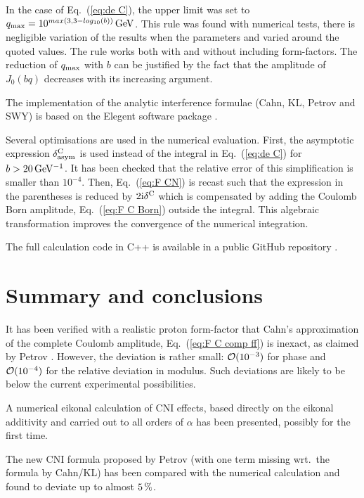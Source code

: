 \documentclass[pdftex,twocolumn,epjc3]{svjour3}
\def\un#1{\,{\rm #1}}
\def\I{{\rm i}}
\begin{document}
In the case of Eq.~(\ref{eq:de C}), the upper limit was set to $q_{\rm max} = 10^{max(3, 3 - log_{10}(b))} \un{GeV}$. This rule was found with numerical tests, there is negligible variation of the results when the parameters and varied around the quoted values. The rule works both with and without including form-factors. The reduction of $q_{\rm max}$ with $b$ can be justified by the fact that the amplitude of $J_0(bq)$ decreases with its increasing argument.

The implementation of the analytic interference formulae (Cahn, KL, Petrov and SWY) is based on the Elegent software package \cite{elegent}.

Several optimisations are used in the numerical evaluation. First, the asymptotic expression $\delta^{\rm C}_{\rm asym}$ is used instead of the integral in Eq.~(\ref{eq:de C}) for $b > 20\un{GeV^{-1}}$. It has been checked that the relative error of this simplification is smaller than $10^{-4}$. Then, Eq.~(\ref{eq:F CN}) is recast such that the expression in the parentheses is reduced by $2\I\delta^{\rm C}$ which is compensated by adding the Coulomb Born amplitude, Eq.~(\ref{eq:F C Born}) outside the integral. This algebraic transformation improves the convergence of the numerical integration.

The full calculation code in C++ is available in a public GitHub repository \cite{code}.




\section{Summary and conclusions}
\label{sec:summary}

It has been verified with a realistic proton form-factor that Cahn's approximation of the complete Coulomb amplitude, Eq.~(\ref{eq:F C comp ff}) is inexact, as claimed by Petrov \cite{petrov2018}. However, the deviation is rather small: ${\cal O}(10^{-3})$ for phase and ${\cal O}(10^{-4})$ for the relative deviation in modulus. Such deviations are likely to be below the current experimental possibilities.

A numerical eikonal calculation of CNI effects, based directly on the eikonal additivity and carried out to all orders of $\alpha$ has been presented, possibly for the first time.

The new CNI formula proposed by Petrov \cite{petrov2018} (with one term missing wrt.~the formula by Cahn/KL) has been compared with the numerical calculation and found to deviate up to almost $5\un{\%}$.
\end{document}
